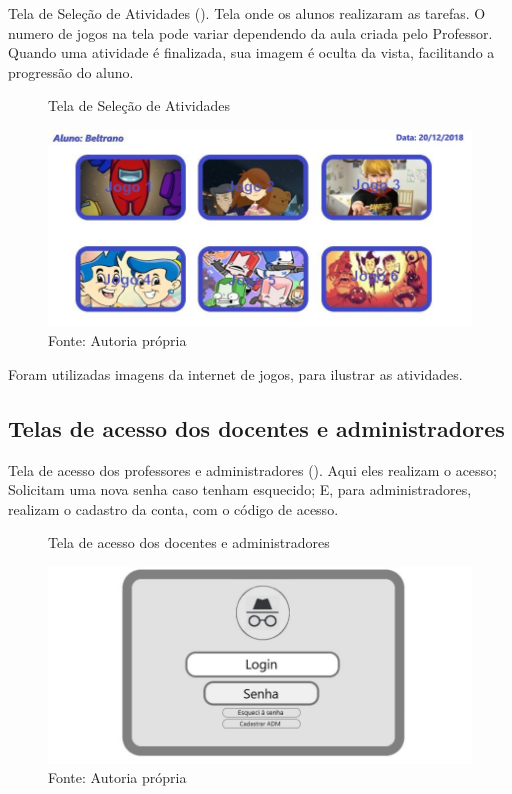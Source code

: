 \documentclass{utfpr-pg}
\begin{document}
        Tela de Seleção de Atividades (). Tela onde os alunos realizaram as tarefas. O numero de jogos na tela pode variar dependendo da aula criada pelo Professor. Quando uma atividade é finalizada, sua imagem é oculta da vista, facilitando a progressão do aluno.
       
       
        \begin{figure}[H]
            \centering
            \captionsetup{width=0.9\textwidth}
            \caption{Tela de Seleção de Atividades}
            \includegraphics[width=\linewidth]{fotos/3.jpg}
            \caption*{Fonte: Autoria própria}
            \label{fig:3}
        \end{figure}
        Foram utilizadas imagens da internet de jogos, para ilustrar as atividades.
   \subsection{Telas de acesso dos docentes e administradores}
   
        Tela de acesso dos professores e administradores (). Aqui eles realizam o acesso; Solicitam uma nova senha caso tenham esquecido; E, para administradores, realizam o cadastro da conta, com o código de acesso.
       
        \begin{figure}[H]
            \centering
            \captionsetup{width=0.9\textwidth}
            \caption{Tela de acesso dos docentes e administradores}
            \includegraphics[width=\linewidth]{fotos/4.jpg}
            \caption*{Fonte: Autoria própria}
            \label{fig:4}
        \end{figure}
        
\end{document}
